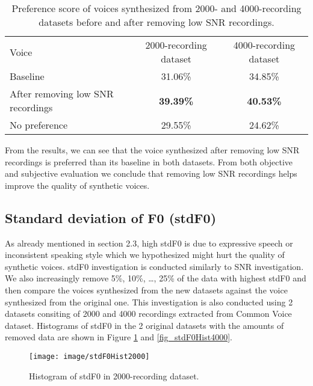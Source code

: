 \documentclass[12pt]{article}
\begin{document}
\begin{table}[]
\begin{center}
\caption{Preference score of voices synthesized from 2000- and 4000-recording datasets before and after removing low SNR recordings.}
\label{tab_subEvaSnr}
\vspace{3mm}
\begin{tabular}{lcc}
\hline
Voice & 2000-recording dataset & 4000-recording dataset \\
\cmidrule(l{0pt}r{2pt}){1-1}\cmidrule(l{0pt}r{2pt}){2-2}\cmidrule(l{0pt}r{2pt}){3-3}
Baseline          & 31.06\% & 34.85\% \\
After removing low SNR recordings  & \textbf{39.39\%} & \textbf{40.53\%} \\
No preference & 29.55\% & 24.62\% \\
\hline
\end{tabular}
\end{center}
\end{table}

From the results, we can see that the voice synthesized after removing low SNR recordings is preferred than its baseline in both datasets. From both objective and subjective evaluation we conclude that removing low SNR recordings helps improve the quality of synthetic voices.

\subsection{Standard deviation of F0 (stdF0)}
As already mentioned in section 2.3, high stdF0 is due to expressive speech or inconsistent speaking style which we hypothesized might hurt the quality of synthetic voices. stdF0 investigation is conducted similarly to SNR investigation. We also increasingly remove 5\%, 10\%, …, 25\% of the data with highest stdF0 and then compare the voices synthesized from the new datasets against the voice synthesized from the original one. This investigation is also conducted using 2 datasets consiting of 2000 and 4000 recordings extracted from Common Voice dataset. Histograms of stdF0 in the 2 original datasets with the amounts of removed data are shown in Figure \ref{fig_stdF0Hist2000} and \ref{fig_stdF0Hist4000}.

\begin{figure}[t]
\begin{center}
\texttt{[image: image/stdF0Hist2000]}
\end{center}
\vspace{-0.3cm}
\caption[stdF0 Hist 2000.]{Histogram of stdF0 in 2000-recording dataset.}
\label{fig_stdF0Hist2000}
\end{figure}
\end{document}

